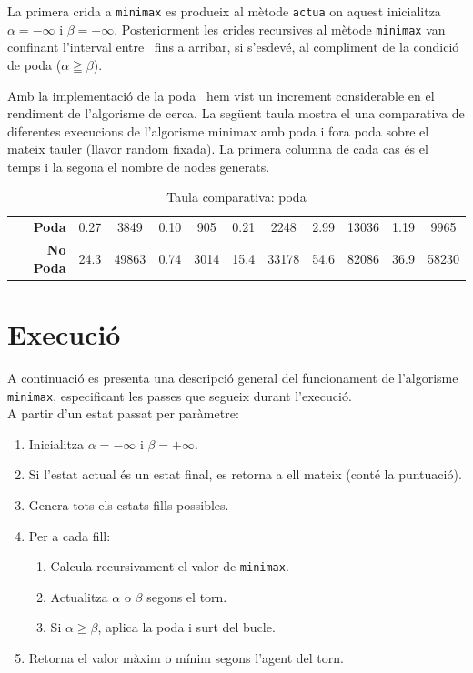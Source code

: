 \documentclass[12pt,a4paper]{report}
\begin{document}
La primera crida a \texttt{minimax} es produeix al mètode
\texttt{actua} on aquest inicialitza $\alpha = -\infty$ i $\beta=+\infty$.
Posteriorment les crides recursives al mètode \texttt{minimax} van confinant l'interval entre \alphabeta\ fins a arribar, 
si s'esdevé, al compliment de la condició de poda ($\alpha \geqq \beta$).

Amb la implementació de la poda \alphabeta\ hem vist un increment considerable en el rendiment de l'algorisme de cerca.
La següent taula mostra el una comparativa de diferentes execucions de l'algorisme minimax amb poda i fora poda sobre el mateix tauler (llavor random fixada).
La primera columna de cada cas és el temps i la segona el nombre de nodes generats.

\begin{table}[h!]
  \centering
  \begin{tabular}{|r|cc|cc|cc|cc|cc|}
    \hline
    \textbf{Poda}    & 0.27 &  3849 & 0.10 &  905 & 0.21 &  2248 & 2.99 & 13036 & 1.19 & 9965 \\
    \textbf{No Poda} & 24.3 & 49863 & 0.74 & 3014 & 15.4 & 33178 & 54.6 & 82086 & 36.9 & 58230 \\
    \hline
  \end{tabular}
  \caption{Taula comparativa: poda \alphabeta}
\end{table}

\newpage

\vspace*{0.1cm} %
\section{Execució}
A continuació es presenta una descripció general del funcionament de l’algorisme \texttt{minimax}, 
especificant les passes que segueix durant l’execució.\\

A partir d’un estat passat per paràmetre:\\
\begin{tcolorbox}[colback=gray!5!white, colframe=black!30, title={Algorisme Minimax}]
\begin{enumerate}[label=\textbf{Pas \arabic*:}, leftmargin=1.2cm]
    \item Inicialitza $\alpha = -\infty$ i $\beta = +\infty$.
    \item Si l’estat actual és un estat final, es retorna a ell mateix (conté la puntuació).
    \item Genera tots els estats fills possibles.
    \item Per a cada fill:
    \begin{enumerate}[label*=\arabic*.]
        \item Calcula recursivament el valor de \texttt{minimax}.
        \item Actualitza $\alpha$ o $\beta$ segons el torn.
        \item Si $\alpha \geq \beta$, aplica la poda i surt del bucle.
    \end{enumerate}
    \item Retorna el valor màxim o mínim segons l’agent del torn.
\end{enumerate}
\end{tcolorbox}
\end{document}

